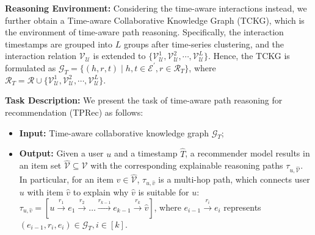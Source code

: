 \vspace{5pt}
\noindent\textbf{Reasoning Environment:}
Considering the time-aware interactions instead, we further obtain a Time-aware Collaborative Knowledge Graph (TCKG), which is the environment of time-aware path reasoning.
Specifically, the interaction timestamps are grouped into $L$ groups after time-series clustering, and the interaction relation ${\mathcal{V}}_{\mathcal{U}}$ is extended to $\{\mathcal{V}_{\mathcal{U}}^1, 
\mathcal{V}_{\mathcal{U}}^2, \cdots, \mathcal{V}_{\mathcal{U}}^{L}\}$.
Hence, the TCKG is formulated as $\mathcal{G}_T=\{(h, r, t) \mid 
h, t \in \mathcal{E}^{\prime}, r \in \mathcal{R}_{T}\}$, where 
$ \mathcal{R}_{T}=\mathcal{R} \cup \{ \mathcal{V}_{\mathcal{U}}^1, 
\mathcal{V}_{\mathcal{U}}^2, \cdots, \mathcal{V}_{\mathcal{U}}^{L} \}$.


\vspace{5pt}
\noindent\textbf{Task Description:}
We present the task of time-aware path reasoning for recommendation (TPRec) as follows:
\begin{itemize}
\item \textbf{Input:} Time-aware collaborative knowledge graph $\mathcal{G}_T$;

\item \textbf{Output:} Given a user $u$ and a timestamp $\hat{T}$, a recommender model results in an item set $\hat{\mathcal{V}} \subseteq 
\mathcal{V} $ with the corresponding explainable reasoning paths $\tau_{u, 
\hat{\mathcal{V}}}$.  
In particular, for an item $\hat{v} \in \hat{\mathcal{V}}$, 
$\tau_{u, \hat{v}}$ is a multi-hop path, which connects user $u$ with item $\hat{v}$ to explain why $\hat{v}$ is suitable for $u$: 
$\tau_{u, \hat{v}}=[u 
\stackrel{r_{1}}{\longrightarrow} e_{1} \stackrel{r_{2}}{\longrightarrow} 
\ldots \stackrel{r_{k-1}}{\longrightarrow} e_{k-1} 
\stackrel{r_{k}}{\longrightarrow} \hat{v}]$, where $e_{i-1} 
\stackrel{r_{i}}{\longrightarrow} e_{i}$ represents $(e_{i-1}, r_i, e_i) \in 
\mathcal{G}_T, i \in [k]$.

\end{itemize} 





